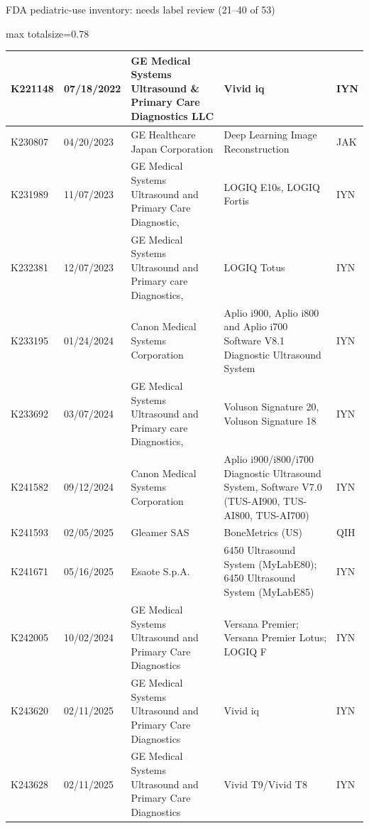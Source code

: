 \documentclass[aspectratio=169]{beamer}
\begin{document}
\begin{frame}[category=FDA appendix]{FDA pediatric-use inventory: needs label review (21--40 of 53)}
\begin{adjustbox}{max totalsize={\textwidth}{0.78\textheight}}
\begin{tabular}{|p{}|p{}|p{}|p{}|p{}|}
K221148 & 07/18/2022 & GE Medical Systems Ultrasound \& Primary Care Diagnostics LLC & Vivid iq & IYN \\ \hline
K230807 & 04/20/2023 & GE Healthcare Japan Corporation & Deep Learning Image Reconstruction & JAK \\ \hline
K231989 & 11/07/2023 & GE Medical Systems Ultrasound and Primary Care Diagnostic, & LOGIQ E10s, LOGIQ Fortis & IYN \\ \hline
K232381 & 12/07/2023 & GE Medical Systems Ultrasound and Primary care Diagnostics, & LOGIQ Totus & IYN \\ \hline
K233195 & 01/24/2024 & Canon Medical Systems Corporation & Aplio i900, Aplio i800 and Aplio i700 Software V8.1 Diagnostic Ultrasound System & IYN \\ \hline
K233692 & 03/07/2024 & GE Medical Systems Ultrasound and Primary care Diagnostics, & Voluson Signature 20, Voluson Signature 18 & IYN \\ \hline
K241582 & 09/12/2024 & Canon Medical Systems Corporation & Aplio i900/i800/i700 Diagnostic Ultrasound System, Software V7.0 (TUS-AI900, TUS-AI800, TUS-AI700) & IYN \\ \hline
K241593 & 02/05/2025 & Gleamer SAS & BoneMetrics (US) & QIH \\ \hline
K241671 & 05/16/2025 & Esaote S.p.A. & 6450 Ultrasound System (MyLabE80); 6450 Ultrasound System (MyLabE85) & IYN \\ \hline
K242005 & 10/02/2024 & GE Medical Systems Ultrasound and Primary Care Diagnostics & Versana Premier; Versana Premier Lotus; LOGIQ F & IYN \\ \hline
K243620 & 02/11/2025 & GE Medical Systems Ultrasound and Primary Care Diagnostics & Vivid iq & IYN \\ \hline
K243628 & 02/11/2025 & GE Medical Systems Ultrasound and Primary Care Diagnostics & Vivid T9/Vivid T8 & IYN \\ \hline
\end{tabular}
\end{adjustbox}
\end{frame}
\end{document}
